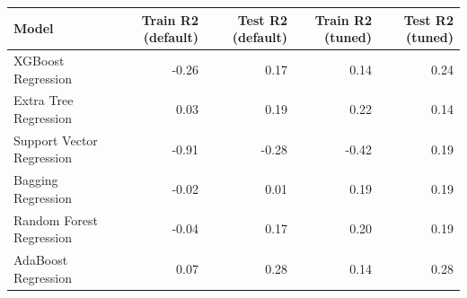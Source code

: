 \begin{tabular}{lrrrr}
\toprule
Model & Train R2 (default) & Test R2 (default) & Train R2 (tuned) & Test R2 (tuned) \\
\midrule
XGBoost Regression & -0.26 & 0.17 & 0.14 & 0.24 \\
Extra Tree Regression & 0.03 & 0.19 & 0.22 & 0.14 \\
Support Vector Regression & -0.91 & -0.28 & -0.42 & 0.19 \\
Bagging Regression & -0.02 & 0.01 & 0.19 & 0.19 \\
Random Forest Regression & -0.04 & 0.17 & 0.20 & 0.19 \\
AdaBoost Regression & 0.07 & 0.28 & 0.14 & 0.28 \\
\bottomrule
\end{tabular}
